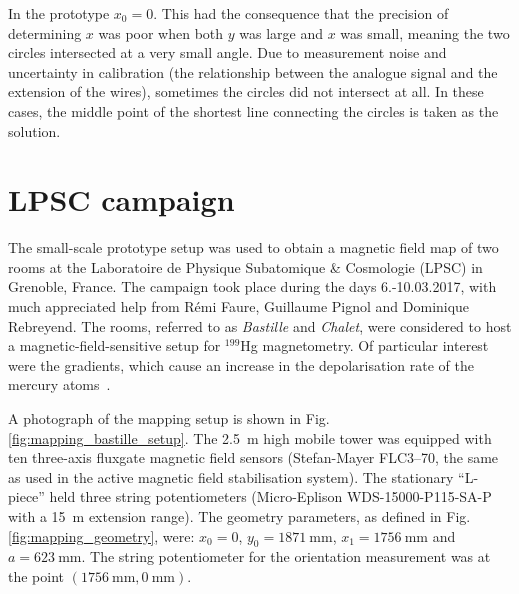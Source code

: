 In the prototype $x_0 = 0$.
This had the consequence that the precision of determining $x$ was poor when both $y$ was large and $x$ was small,
meaning the two circles intersected at a very small angle.
Due to measurement noise and uncertainty in calibration (the relationship between the analogue signal and the extension of the wires), sometimes the circles did not intersect at all.
In these cases, the middle point of the shortest line connecting the circles is taken as the solution.




\section{LPSC campaign}
\label{sec:lpsc_campaign}
The small-scale prototype setup was used to obtain a magnetic field map of two rooms at the Laboratoire de Physique Subatomique \& Cosmologie (LPSC) in Grenoble, France.
The campaign took place during the days 6.-10.03.2017, with much appreciated help from Rémi Faure, Guillaume Pignol and Dominique Rebreyend.
The rooms, referred to as \emph{Bastille} and \emph{Chalet}, were considered to host a magnetic-field-sensitive setup for ${}^{199}$Hg magnetometry.
Of particular interest were the gradients, which cause an increase in the depolarisation rate of the mercury atoms~\cite{FertlThesis}.

A photograph of the mapping setup is shown in Fig.\,\ref{fig:mapping_bastille_setup}.
The \SI{2.5}{\metre} high mobile tower was equipped with ten three-axis fluxgate magnetic field sensors (Stefan-Mayer FLC3--70, the same as used in the active magnetic field stabilisation system).
The stationary ``L-piece'' held three string potentiometers (Micro-Eplison WDS-15000-P115-SA-P with a \SI{15}{\metre} extension range).
The geometry parameters, as defined in Fig.\,\ref{fig:mapping_geometry}, were: $x_0 = 0$, $y_0 = \SI{1871}{\milli\metre}$, $x_1 = \SI{1756}{\milli\metre}$ and $a = \SI{623}{\milli\metre}$.
The string potentiometer for the orientation measurement was at the point $(\SI{1756}{\milli\metre}, \SI{0}{\milli\metre})$.


